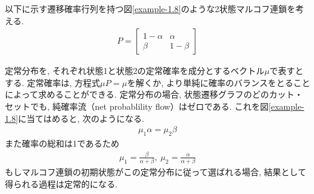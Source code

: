 \documentclass[a4j]{jsarticle}
\begin{document}


 以下に示す遷移確率行列を持つ図\ref{example-1.8}のような2状態マルコフ連鎖を考える.
\begin{align}
	P = \begin{bmatrix}
		    1-\alpha & \alpha  \\
		    \beta    & 1-\beta
	    \end{bmatrix}
\end{align}

定常分布を, それぞれ状態1と状態2の定常確率を成分とするベクトル$\mu$で表すとする. 定常確率は, 方程式$\mu P = \mu$を解くか, より単純に確率のバランスをとることによって求めることができる. 定常分布の場合, 状態遷移グラフのどのカット・セットでも, 純確率流（net probablility flow）はゼロである. これを図\ref{example-1.8}に当てはめると, 次のようになる.
\begin{align}
	\mu_1\alpha = \mu_2\beta
\end{align}
また確率の総和は1であるため
\begin{align}
	\mu_1 = \frac{\beta}{\alpha + \beta},\: \mu_2 = \frac{\alpha}{\alpha + \beta}
\end{align}
もしマルコフ連鎖の初期状態がこの定常分布に従って選ばれる場合, 結果として得られる過程は定常的になる.
\end{document}
